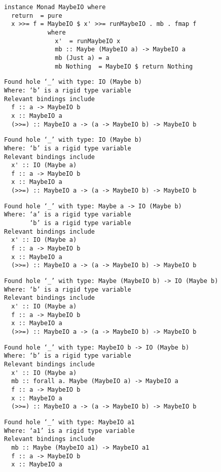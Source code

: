 \documentclass{beamer}
\begin{document}
\begin{frame}[fragile]
\begin{overprint}
\begin{verbatim}
instance Monad MaybeIO where
  return  = pure
  x >>= f = MaybeIO $ x' >>= runMaybeIO . mb . fmap f
            where
              x'  = runMaybeIO x
              mb :: Maybe (MaybeIO a) -> MaybeIO a
              mb (Just a) = a
              mb Nothing  = MaybeIO $ return Nothing
\end{verbatim}
\end{overprint}
\bigskip
\scriptsize
\begin{overprint}
\begin{verbatim}
Found hole ‘_’ with type: IO (Maybe b)
Where: ‘b’ is a rigid type variable
Relevant bindings include
  f :: a -> MaybeIO b
  x :: MaybeIO a
  (>>=) :: MaybeIO a -> (a -> MaybeIO b) -> MaybeIO b
\end{verbatim}
\begin{verbatim}
Found hole ‘_’ with type: IO (Maybe b)
Where: ‘b’ is a rigid type variable
Relevant bindings include
  x' :: IO (Maybe a)
  f :: a -> MaybeIO b
  x :: MaybeIO a
  (>>=) :: MaybeIO a -> (a -> MaybeIO b) -> MaybeIO b
\end{verbatim}
\begin{verbatim}
Found hole ‘_’ with type: Maybe a -> IO (Maybe b)
Where: ‘a’ is a rigid type variable
       ‘b’ is a rigid type variable
Relevant bindings include
  x' :: IO (Maybe a)
  f :: a -> MaybeIO b
  x :: MaybeIO a
  (>>=) :: MaybeIO a -> (a -> MaybeIO b) -> MaybeIO b
\end{verbatim}
\begin{verbatim}
Found hole ‘_’ with type: Maybe (MaybeIO b) -> IO (Maybe b)
Where: ‘b’ is a rigid type variable
Relevant bindings include
  x' :: IO (Maybe a)
  f :: a -> MaybeIO b
  x :: MaybeIO a
  (>>=) :: MaybeIO a -> (a -> MaybeIO b) -> MaybeIO b
\end{verbatim}
\begin{verbatim}
Found hole ‘_’ with type: MaybeIO b -> IO (Maybe b)
Where: ‘b’ is a rigid type variable
Relevant bindings include
  x' :: IO (Maybe a)
  mb :: forall a. Maybe (MaybeIO a) -> MaybeIO a
  f :: a -> MaybeIO b
  x :: MaybeIO a
  (>>=) :: MaybeIO a -> (a -> MaybeIO b) -> MaybeIO b
\end{verbatim}
\begin{verbatim}
Found hole ‘_’ with type: MaybeIO a1
Where: ‘a1’ is a rigid type variable
Relevant bindings include
  mb :: Maybe (MaybeIO a1) -> MaybeIO a1
  f :: a -> MaybeIO b
  x :: MaybeIO a

\end{verbatim}
\end{overprint}
\end{frame}
\end{document}
